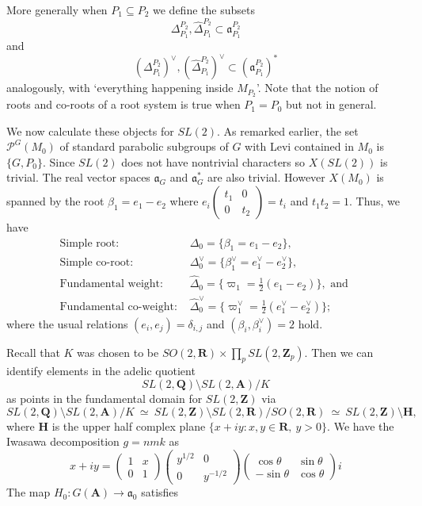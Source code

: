 \documentclass{ims9x6}
\def\A{\mathbf A}
\def\Q{\mathbf Q}
\def\R{\mathbf R}
\def\Z{\mathbf Z}
\def\PPP{\mathcal P}
\def\aaa{\mathfrak a}
\def\bs{\setminus}
\def\se{\subseteq}
\begin{document}
More generally when $P_1 \se P_2$ we define the subsets
\[ \Delta_{P_1}^{P_2}, \hat\Delta_{P_1}^{P_2} \subset \aaa_{P_1}^{P_2} \]
and
\[ (\Delta_{P_1}^{P_2})^\vee, (\hat\Delta_{P_1}^{P_2})^\vee \subset (\aaa_{P_1}^{P_2})^* \]
analogously, with `everything happening inside $M_{P_2}$'. Note that the notion of roots and co-roots of a root system is true when $P_1 = P_0$ but not in general. 

We now calculate these objects for $SL(2)$. As remarked earlier, the set $\PPP^G(M_0)$ of standard parabolic subgroups of $G$ with Levi contained in $M_0$ is $\{G, P_0\}$. Since $SL(2)$ does not have nontrivial characters so $X(SL(2))$ is trivial. The real vector spaces $\aaa_G$ and $\aaa_G^*$ are also trivial. However $X(M_0)$ is spanned by the root $\beta_1 = e_1 - e_2$ where $e_i\begin{pmatrix} t_1 & 0 \\ 0 & t_2 \end{pmatrix} = t_i$ and $t_1 t_2 = 1$. 
Thus, we have
\begin{align*}
	 \text{Simple root: } & \Delta_0 = \{\beta_1 = e_1 - e_2 \}, \\
	 \text{Simple co-root: } & \Delta_0^\vee = \{ \beta_1^\vee = e_1^\vee - e_2^\vee \}, \\
	 \text{Fundamental weight: } & \hat\Delta_0 = \{ \varpi_1 = \frac{1}{2}(e_1 - e_2) \}, \text{ and } \\
	 \text{Fundamental co-weight: } & \hat\Delta_0^\vee = \{ \varpi_1^\vee = \frac{1}{2}(e_1^\vee - e_2^\vee) \};
\end{align*}
where the usual relations $(e_i, e_j) = \delta_{i, j}$ and $(\beta_i, \beta_i^\vee) = 2$ hold. 

Recall that $K$ was chosen to be $SO(2, \R) \times \displaystyle\prod_p SL(2, \Z_p)$. Then we can identify elements in the adelic quotient 
\[ SL(2, \Q) \bs SL(2, \A) / K \]
as points in the fundamental domain for $SL(2, \Z)$ via
\begin{equation} \label{fund_dom} 
SL(2, \Q) \bs SL(2, \A) / K \ \simeq \ SL(2, \Z) \bs SL(2, \R) / SO(2, \R) \ 
		\simeq \ SL(2, \Z) \bs \mathbf H,
\end{equation}
where $\mathbf H$ is the upper half complex plane $\{ x + i y : x, y \in \R, \ y > 0\}$. We have the Iwasawa decomposition $g = nmk$ as 
\[ x + i y = \begin{pmatrix} 1 & x \\ 0 & 1 \end{pmatrix} \begin{pmatrix} y^{1/2} & 0 \\ 0 & y^{-1/2} \end{pmatrix}
		\begin{pmatrix} \cos \theta & \sin \theta \\ -\sin \theta & \cos \theta \end{pmatrix} i \]
The map $H_0 : G(\A) \to \aaa_0$ satisfies
\end{document}
